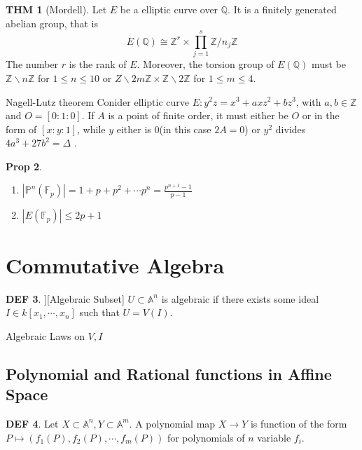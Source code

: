 \documentclass[twocolumn]{article}
\newcommand{\A}{\mathbb{A}}
\newcommand{\Z}{\mathbb{Z}}
\newcommand{\F}{\mathbb{F}}
\newcommand{\Q}{\mathbb{Q}}
\renewcommand{\P}{\mathbb{P}}
\theoremstyle{definition}
\newtheorem{thm}{THM}
\newtheorem{prop}[thm]{Prop}
\newtheorem{defi}[thm]{DEF}
\theoremstyle{remark}
\begin{document}
\begin{thm}[Mordell] 
	Let $E$ be a elliptic curve over $\Q$. It is a finitely generated abelian group, that is 
	$$
	E(\Q) \cong  \Z^r \times \prod_{j=1}^s \Z / n_j \Z
	$$
	The number $r$ is the rank of $E$.
	Moreover, the torsion group of $E(\Q)$ must be $\Z \backslash n\Z$ for $1 \leq n \leq 10$ or $Z \backslash 2m \Z \times \Z \backslash 2\Z$ for $1 \leq m \leq 4$.
\end{thm}

\begin{fthm}{Nagell-Lutz theorem}{}
	Conider elliptic curve $E: y^2z = x^3 + axz^2 + bz^3$, with $a, b \in \Z$ and $O = [0:1:0]$.
	If $A$ is a point of finite order, it must either be $O$ or in the form of $[x:y:1]$, while $y $ either is $0$(in this case $2A = 0$) or $y^2$ divides $4a^3 + 27b^2 = \Delta$ .
\end{fthm}

\begin{prop} 
	\begin{enumerate}
		\item $|\P^n(\F_p)| = 1 + p + p^2 + \cdots p^n = \frac{p^{n+1}-1}{p-1}$
		\item $|E(\F_p)| \leq 2p + 1$
	\end{enumerate}
\end{prop}

\section{Commutative Algebra}

\begin{defi}][Algebraic Subset]
	$U \subset \A^n$ is algebraic if there exists some ideal $I \in k[x_1, \cdots, x_n]$ such that $U = V(I)$.
\end{defi}

\begin{toverify}{Algebraic Laws on $V, I$}{}

\end{toverify}

\subsection{Polynomial and Rational functions in Affine Space}

\begin{defi}
Let $X \subset \A^n, Y \subset \A^m$. 
A polynomial map $X \rightarrow Y$ is function of the form $P \mapsto (f_1(P), f_2(P), \cdots, f_m(P))$ for polynomials of $n$ variable $f_i$.
\end{defi}
\end{document}
